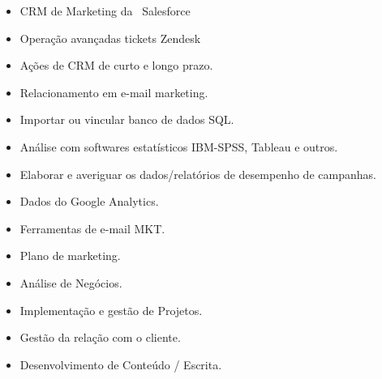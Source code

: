 \begin{itemize}[nosep,
	labelwidth=1.8em,   %
	labelsep=0.5em,     %
	leftmargin=!,       %
	itemsep=3pt]        %
	\item[\faArchive]      CRM de Marketing da \faSalesforce\ Salesforce
	\item[\faDesktop]      Operação avançadas tickets Zendesk
	\item[\faCommentsDollar]  Ações de CRM de curto e longo prazo.
	\item[\faMailBulk]     Relacionamento em e-mail marketing.
	\item[\faHockeyPuck]   Importar ou vincular banco de dados SQL.
	\item[\faMagic]        Análise com softwares estatísticos IBM-SPSS, Tableau e outros.
	\item[\faMapSigns]     Elaborar e averiguar os dados/relatórios de desempenho de campanhas.
	\item[\faGooglePlusG]  Dados do Google Analytics.
	\item[\faInbox]        Ferramentas de e-mail MKT.
	\item[\faLaptopHouse]  Plano de marketing.
	\item[\faHandHoldingUsd]  Análise de Negócios.
	\item[\faHandsWash]    Implementação e gestão de Projetos.
	\item[\faHeadSideCough]  Gestão da relação com o cliente.
	\item[\faHighlighter]  Desenvolvimento de Conteúdo / Escrita.
\end{itemize}
